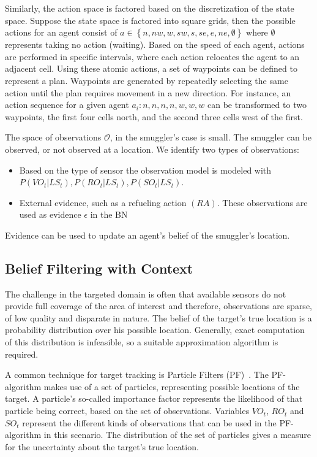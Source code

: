 \documentclass[conference]{IEEEtran}
\begin{document}
Similarly, the action space is factored based on the discretization of the state space. Suppose the state space is factored into square grids, then the possible actions for an agent consist of $a\in\left\{n, nw, w, sw, s, se, e, ne, \emptyset \right\}$ where $\emptyset$ represents taking no action (\ie waiting). Based on the speed of each agent, actions are performed in specific intervals, where each action relocates the agent to an adjacent cell. Using these atomic actions, a set of waypoints can be defined to represent a plan. Waypoints are generated by repeatedly selecting the same action until the plan requires movement in a new direction. For instance, an action sequence for a given agent $a_i: n, n, n, n, w, w, w$ can be transformed to two waypoints, the first four cells north, and the second three cells west of the first.

The space of observations $\mathcal{O}$, in the smuggler's case is small. The smuggler can be observed, or not observed at a location. We identify two types of observations:
\begin{itemize}
\item Based on the type of sensor the observation model is modeled with $P(VO_t|LS_t), P(RO_t|LS_t), P(SO_t|LS_t)$.
\item External evidence, such as a refueling action $(RA)$. These observations are used as evidence $\epsilon$ in the BN
\end{itemize}
Evidence can be used to update an agent's belief of the smuggler's location.

\subsection{Belief Filtering with Context}
\label{subsec:belief-filter}

The challenge in the targeted domain is often that available sensors do not provide full coverage of the area of interest and therefore, observations are sparse, of low quality and disparate in nature. The belief of the target's true location is a probability distribution over his possible location. Generally, exact computation of this distribution is infeasible, so a suitable approximation algorithm is required.

A common technique for target tracking is Particle Filters (PF)~\cite{Blackman1999}. The PF-algorithm makes use of a set of particles, representing possible locations of the target. A particle's so-called importance factor represents the likelihood of that particle being correct, based on the set of observations. Variables $VO_t$, $RO_t$ and $SO_t$ represent the different kinds of observations that can be used in the PF-algorithm in this scenario. The distribution of the set of particles gives a measure for the uncertainty about the target's true location.
\end{document}
